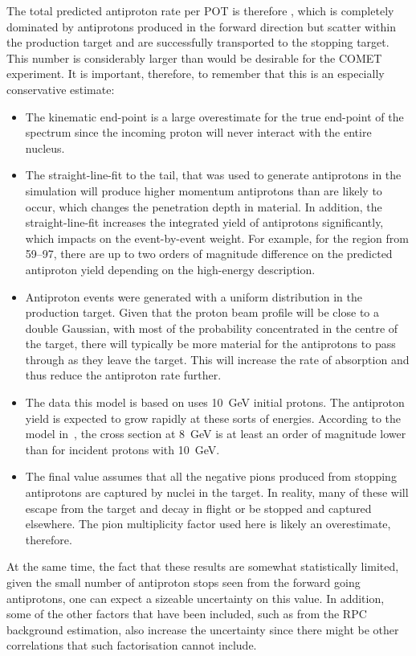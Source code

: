 The total predicted antiproton rate per \ac{POT} is therefore \VarBgAntiprotonsPerPOT, which is completely dominated by antiprotons produced in the forward direction but scatter within the production target and are successfully transported to the stopping target.
This number is considerably larger than would be desirable for the COMET experiment.
It is important, therefore, to remember that this is an especially conservative estimate:
\begin{itemize}
\item The kinematic end-point is a large overestimate for the true end-point of the spectrum since the incoming proton will never interact with the entire nucleus.  
\item The straight-line-fit to the tail, that was used to generate antiprotons in the simulation will produce higher momentum antiprotons than are likely to occur, which changes the penetration depth in material.
      In addition, the straight-line-fit increases the integrated yield of antiprotons significantly, which impacts on the event-by-event weight.
      For example, for the region from  59--97\degree, there are up to two orders of magnitude difference on the predicted antiproton yield depending on the high-energy description.
\item Antiproton events were generated with a uniform distribution in the production target. Given that the proton beam profile will be close to a double Gaussian, with most of the probability concentrated in the centre of the target, there will typically be more material for the antiprotons to pass through as they leave the target.  This will increase the rate of absorption and thus reduce the antiproton rate further.
\item The data this model is based on uses 10~GeV initial protons. The antiproton yield is expected to grow rapidly at these sorts of energies.
      According to the model in~\cite{Meco024}, the cross section at 8~GeV is at least an order of magnitude lower than for incident protons with 10~GeV.
\item The final value assumes that all the negative pions produced from stopping antiprotons are captured by nuclei in the target.  In reality, many of these will escape from the target and decay in flight or be stopped and captured elsewhere.  The pion multiplicity factor used here is likely an overestimate, therefore.
\end{itemize}
At the same time, the fact that these results are somewhat statistically limited, given the small number of antiproton stops seen from the forward going antiprotons, one can expect a sizeable uncertainty on this value.
In addition, some of the other factors that have been included, such as from the RPC background estimation, also increase the uncertainty since there might be other correlations that such factorisation cannot include.

